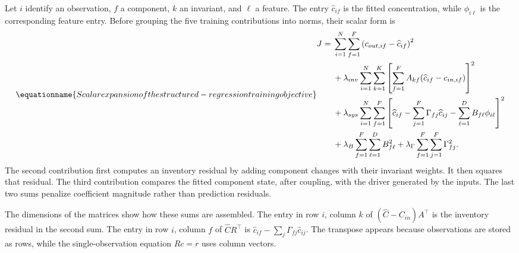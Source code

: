 Let \(i\) identify an observation, \(f\) a component, \(k\) an invariant, and \(\ell\) a feature. The entry \(\widehat c_{if}\) is the fitted concentration, while \(\phi_{i\ell}\) is the corresponding feature entry. Before grouping the five training contributions into norms, their scalar form is
\begin{equation}
\equationname{Scalar expansion of the structured-regression training objective}
\label{eq:icsor_training_scalar}
\begin{aligned}
J={}&\sum_{i=1}^{N}\sum_{f=1}^{F}
\left(c_{out,if}-\widehat c_{if}\right)^2\\
&+\lambda_{inv}\sum_{i=1}^{N}\sum_{k=1}^{K}
\left[\sum_{f=1}^{F}A_{kf}(\widehat c_{if}-c_{in,if})\right]^2\\
&+\lambda_{sys}\sum_{i=1}^{N}\sum_{f=1}^{F}
\left[\widehat c_{if}-\sum_{j=1}^{F}\Gamma_{fj}\widehat c_{ij}
-\sum_{\ell=1}^{D}B_{f\ell}\phi_{i\ell}\right]^2\\
&+\lambda_B\sum_{f=1}^{F}\sum_{\ell=1}^{D}B_{f\ell}^2
+\lambda_{\Gamma}\sum_{f=1}^{F}\sum_{j=1}^{F}\Gamma_{fj}^2.
\end{aligned}
\end{equation}
The second contribution first computes an inventory residual by adding component changes with their invariant weights. It then squares that residual. The third contribution compares the fitted component state, after coupling, with the driver generated by the inputs. The last two sums penalize coefficient magnitude rather than prediction residuals.

The dimensions of the matrices show how these sums are assembled. The entry in row \(i\), column \(k\) of \((\widehat C-C_{in})A^\top\) is the inventory residual in the second sum. The entry in row \(i\), column \(f\) of \(\widehat C R^\top\) is \(\widehat c_{if}-\sum_j\Gamma_{fj}\widehat c_{ij}\). The transpose appears because observations are stored as rows, while the single-observation equation \(Rc=r\) uses column vectors.

